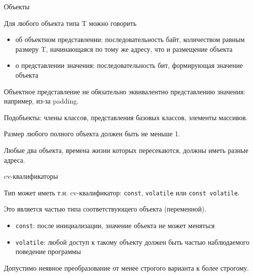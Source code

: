 \documentclass[unknownkeysallowed,xcolor=table]{beamer}
\begin{document}
\begin{frame}{Объекты}

Для любого объекта типа T можно говорить
\begin{itemize}
  \item об объектном представлении: последовательность байт, количеством равным размеру T, начинающаяся по тому же адресу, что и размещение объекта
  \item о представлении значения: последовательность бит, формирующая значение объекта
\end{itemize}

Объектное представление не обязательно эквивалентно представлению значения: например, из-за padding. \vspace{0.5em}

Подобъекты: члены классов, представления базовых классов, элементы массивов. \vspace{0.5em}

Размер любого полного объекта должен быть не меньше 1. \vspace{0.5em}

Любые два объекта, времена жизни которых пересекаются, должны иметь разные адреса.

\end{frame}

\begin{frame}{cv-квалификаторы}

Тип может иметь т.н. cv-квалификатор: \lstinline[basicstyle=\ttfamily\small]{const}, \lstinline[basicstyle=\ttfamily\small]{volatile} или \lstinline[basicstyle=\ttfamily\small]{const volatile}.

Это является частью типа соответствующего объекта (переменной). \vspace{1em}

\begin{itemize}
  \item \lstinline[basicstyle=\ttfamily\small]{const}: после инициализации, значение объекта не может меняться \vspace{1em}
  \item \lstinline[basicstyle=\ttfamily\small]{volatile}: любой доступ к такому объекту должен быть частью наблюдаемого поведение программы
\end{itemize}

\vspace{1em}

Допустимо неявное преобразование от менее строгого варианта к более строгому.

\end{frame}
\end{document}
